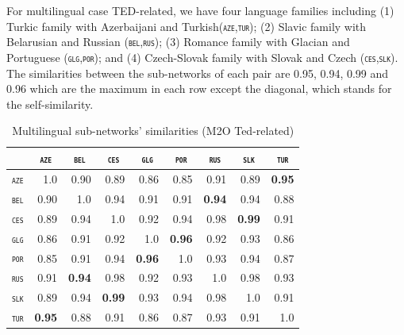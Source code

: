 \documentclass[11pt]{article}
\newcommand{\domain}[1]{\texttt{\textsc{#1}}}
\newcommand{\SB}[1]{\textbf{#1}}
\begin{document}
For multilingual case TED-related, we have four language families including (1) Turkic family with Azerbaijani and Turkish(\domain{aze},\domain{tur}); (2) Slavic family with Belarusian and Russian (\domain{bel},\domain{rus}); (3) Romance family with Glacian and Portuguese (\domain{glg},\domain{por}); and (4) Czech-Slovak family with Slovak and Czech (\domain{ces},\domain{slk}). The similarities between the sub-networks of each pair are 0.95, 0.94, 0.99 and 0.96 which are the maximum in each row except the diagonal, which stands for the self-similarity.
\begin{table}[h!]
  \centering
  \begin{tabular}{|p{1cm}|*{8}{r|}} \hline
    & \multicolumn{1}{c|}{\domain{aze}} & \multicolumn{1}{c|}{\domain{bel}}& \multicolumn{1}{c|}{\domain{ces}} & \multicolumn{1}{c|}{\domain{glg}} & \multicolumn{1}{c|}{\domain{por}} & \multicolumn{1}{c|}{\domain{rus}} &\multicolumn{1}{c|}{\domain{slk}}&\multicolumn{1}{c|}{\domain{tur}} \\ \hline 
    \domain{aze} &1.0&0.90&0.89&0.86&0.85&0.91&0.89&\SB{0.95}\\
    \domain{bel} &0.90&1.0&0.94&0.91&0.91&\SB{0.94}&0.94&0.88\\
    \domain{ces} &0.89&0.94&1.0&0.92&0.94&0.98&\SB{0.99}&0.91\\
    \domain{glg} &0.86&0.91&0.92&1.0&\SB{0.96}&0.92&0.93&0.86\\ 
    \domain{por} &0.85&0.91&0.94&\SB{0.96}&1.0&0.93&0.94&0.87\\ 
    \domain{rus} &0.91&\SB{0.94}&0.98&0.92&0.93&1.0&0.98&0.93\\
    \domain{slk} &0.89&0.94&\SB{0.99}&0.93&0.94&0.98&1.0&0.91\\
    \domain{tur} &\SB{0.95}&0.88&0.91&0.86&0.87&0.93&0.91&1.0\\
    \hline
  \end{tabular}
  \caption{Multilingual sub-networks' similarities (M2O Ted-related)}
  \label{tab:related-sim}
\end{table}
\end{document}
